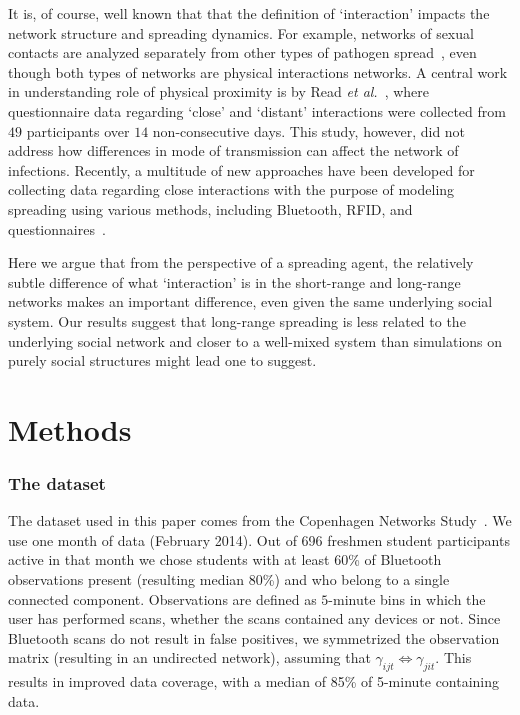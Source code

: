 \documentclass[fleqn,10pt]{wlscirep}
\begin{document}
It is, of course, well known that that the definition of `interaction' impacts the network structure and spreading dynamics.
For example, networks of sexual contacts are analyzed separately from other types of pathogen spread~\cite{liljeros2001web, rocha2011simulated}, even though both types of networks are physical interactions networks.
A central work in understanding role of physical proximity is by Read \emph{et al.}~\cite{read2008dynamic}, where questionnaire data regarding `close' and `distant' interactions were collected from $49$ participants over $14$ non-consecutive days.
This study, however, did not address how differences in mode of transmission can affect the network of infections.
Recently, a multitude of new approaches have been developed for collecting data regarding close interactions with the purpose of modeling spreading using various methods, including Bluetooth, RFID, and questionnaires~\cite{salathe2012digital, read2008dynamic, salathe2010high, danon2011networks, christakis2010social, xiao2016clustering}.

Here we argue that from the perspective of a spreading agent, the relatively subtle difference of what `interaction' is in the short-range and long-range networks makes an important difference, even given the same underlying social system.
Our results suggest that long-range spreading is less related to the underlying social network and closer to a well-mixed system than simulations on purely social structures might lead one to suggest. 

\section*{Methods}
\subsubsection*{The dataset}
The dataset used in this paper comes from the Copenhagen Networks Study~\cite{10.1371/journal.pone.0095978}.
We use one month of data (February 2014). 
Out of 696 freshmen student participants active in that month we chose students with at least 60\% of Bluetooth observations present (resulting median 80\%) and who belong to a single connected component.
Observations are defined as $5$-minute bins in which the user has performed scans, whether the scans contained any devices or not. 
Since Bluetooth scans do not result in false positives, we symmetrized the observation matrix (resulting in an undirected network), assuming that $\gamma_{ijt} \iff \gamma_{jit}$.
This results in improved data coverage, with a median of 85\% of 5-minute containing data.
\end{document}
